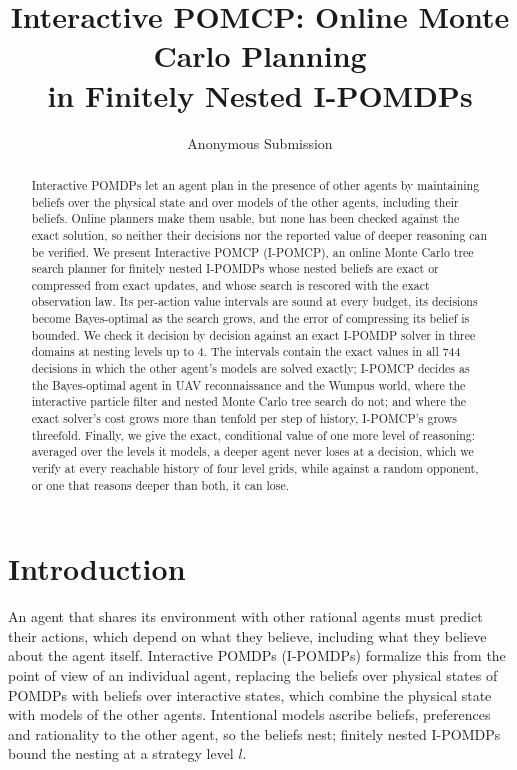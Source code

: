 \documentclass{article}
\title{Interactive POMCP: Online Monte Carlo Planning\\in Finitely Nested I-POMDPs}
\author{
    Anonymous Submission
}
\begin{document}
\maketitle

\begin{abstract}
Interactive POMDPs let an agent plan in the presence of other agents by maintaining beliefs over the physical state and over models of the other agents, including their beliefs. Online planners make them usable, but none has been checked against the exact solution, so neither their decisions nor the reported value of deeper reasoning can be verified. We present Interactive POMCP (I-POMCP), an online Monte Carlo tree search planner for finitely nested I-POMDPs whose nested beliefs are exact or compressed from exact updates, and whose search is rescored with the exact observation law. Its per-action value intervals are sound at every budget, its decisions become Bayes-optimal as the search grows, and the error of compressing its belief is bounded. We check it decision by decision against an exact I-POMDP solver in three domains at nesting levels up to 4. The intervals contain the exact values in all 744 decisions in which the other agent's models are solved exactly; I-POMCP decides as the Bayes-optimal agent in UAV reconnaissance and the Wumpus world, where the interactive particle filter and nested Monte Carlo tree search do not; and where the exact solver's cost grows more than tenfold per step of history, I-POMCP's grows threefold. Finally, we give the exact, conditional value of one more level of reasoning: averaged over the levels it models, a deeper agent never loses at a decision, which we verify at every reachable history of four level grids, while against a random opponent, or one that reasons deeper than both, it can lose.
\end{abstract}

\section{Introduction}
\label{sec:intro}

An agent that shares its environment with other rational agents must predict their actions, which depend on what they believe, including what they believe about the agent itself. Interactive POMDPs (I-POMDPs) \cite{gmytrasiewicz2005framework} formalize this from the point of view of an individual agent, replacing the beliefs over physical states of POMDPs \cite{kaelbling1998planning} with beliefs over interactive states, which combine the physical state with models of the other agents. Intentional models ascribe beliefs, preferences and rationality to the other agent, so the beliefs nest; finitely nested I-POMDPs bound the nesting at a strategy level $l$.
\end{document}
